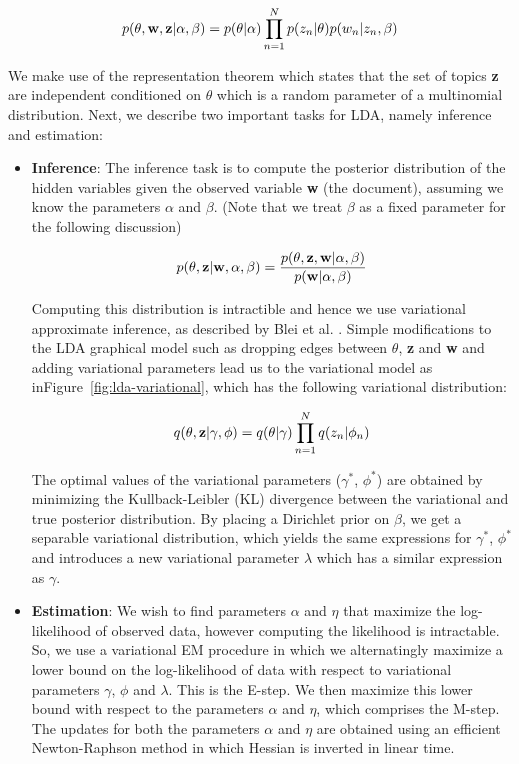\documentclass{article} %
\begin{document}
\begin{equation} \label{eq1}
p(\theta,{\bf w},{\bf z} | \alpha,\beta ) = p(\theta|\alpha)\prod_{n=1}^{N}p(z_{n}|\theta)p(w_{n}|z_{n},\beta) 
\end{equation}

We make use of the representation theorem which states that the set of topics
{\bf z} are independent conditioned on $\theta$ which is a random parameter of 
a multinomial distribution. Next, we describe two important tasks for LDA, 
namely inference and estimation:

\begin{itemize}[leftmargin=*]

\item[] {\bf Inference}: The inference task is to compute the posterior 
distribution of the hidden variables given the observed variable {\bf w} (the 
document), assuming we know the parameters $\alpha$ and $\beta$. (Note that 
we treat $\beta$ as a fixed parameter for the following discussion)

\begin{equation} \label{eq2}
p(\theta,{\bf z} | {\bf w},\alpha,\beta ) = \frac{p(\theta,{\bf z}, {\bf w}|\alpha,\beta)}{p({\bf w}|\alpha,\beta)} 
\end{equation}

Computing this distribution is intractible and hence we use variational 
approximate inference, as described by Blei et al. \cite{lda}. Simple 
modifications to the LDA graphical model such as dropping edges between 
$\theta$, {\bf z} and 
{\bf w} and adding variational parameters lead us to the variational model as inFigure~\ref{fig:lda-variational}, which has the following variational distribution:
 
\begin{equation} \label{eq3}
q(\theta,{\bf z}|\gamma, \phi) = q(\theta|\gamma)\prod_{n=1}^{N}q(z_{n}|\phi_{n})
\end{equation}

The optimal values of the variational parameters ($\gamma^{*}$, $\phi^{*}$) are 
obtained by minimizing the
Kullback-Leibler (KL) divergence between the variational and true posterior
distribution. By placing a Dirichlet prior on $\beta$, we get a separable 
variational distribution, which yields the same expressions for $\gamma^{*}$, 
$\phi^{*}$ and introduces a new variational parameter $\lambda$ which has a 
similar expression as $\gamma$.

\item[] {\bf Estimation}: We wish to find parameters $\alpha$ and $\eta$ that
maximize the log-likelihood of observed data, however computing the likelihood
is intractable. So, we use a variational EM procedure in which we alternatingly
maximize a lower bound on the log-likelihood of data with respect to 
variational parameters $\gamma$, $\phi$ and $\lambda$. This is the E-step. We 
then maximize this lower bound with respect to the parameters $\alpha$ and 
$\eta$, which comprises the M-step. The updates for both the parameters $\alpha$
and $\eta$ are obtained using an efficient Newton-Raphson method in which 
Hessian is inverted in linear time.

\end{itemize}
\end{document}
